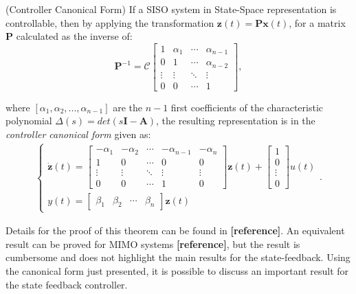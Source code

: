 \documentclass[a4paper,11pt]{book}
\numberwithin{figure}{chapter}
\numberwithin{equation}{chapter}
\numberwithin{table}{chapter}
\newtheorem{theorem}{Theorem}[chapter]
\theoremstyle{definition}
\newcounter{boxed-theorem}
\newenvironment{boxed-theorem}[1]
{\colorlet{shadecolor}{pastelBlue2!10} \begin{shaded} \begin{theorem}{#1}}
{\end{theorem} \end{shaded}}
\newcounter{boxed-definition}
\newcounter{boxed-example}
\begin{document}
\begin{boxed-theorem}{(Controller Canonical Form)} \label{th:controlCanon}
    If a SISO system in State-Space representation is controllable, then by applying the transformation $\bm{z}(t) = \bm{P}\bm{x}(t)$, for a matrix $\bm{P}$ calculated as the inverse of:
    \begin{equation}
        \bm{P}^{-1} = \bm{\mathcal{C}} \begin{bmatrix}
        1 & \alpha_1 & \cdots  & \alpha_{n-1} \\
        0 & 1 & \cdots & \alpha_{n-2} \\
        \vdots & \vdots & \ddots & \vdots \\
        0 & 0 & \cdots &1
        \end{bmatrix}
    ,\end{equation}
    
    \noindent where $[\alpha_1, \alpha_2, ..., \alpha_{n-1}]$ are the $n-1$ first coefficients of the characteristic polynomial $\Delta(s) = det(s\bm{I} - \bm{A})$, the resulting representation is in the \textit{controller canonical form} given as:
    \begin{align}
    \begin{cases}
        \dot{\bm{z}}(t) = \begin{bmatrix}
            -\alpha_1 & -\alpha_2 & \cdots & -\alpha_{n-1} & -\alpha_n \\
            1 & 0 & \cdots & 0 & 0 \\
            \vdots & \vdots & \ddots & \vdots & \vdots \\
            0 & 0 & \cdots & 1 & 0 
        \end{bmatrix} \bm{z}(t) + \begin{bmatrix}
            1 \\ 0 \\ \vdots \\ 0
        \end{bmatrix} u(t) \\
        y(t) = \begin{bmatrix} \beta_1 & \beta_2 & \cdots & \beta_n \end{bmatrix} \bm{z}(t)
    \end{cases}
    .\end{align}
\end{boxed-theorem} 

Details for the proof of this theorem can be found in \textbf{[reference]}. An equivalent result can be proved for MIMO systems \textbf{[reference]}, but the result is cumbersome and does not highlight the main results for the state-feedback. Using the canonical form just presented, it is possible to discuss an important result for the state feedback controller.
\end{document}
